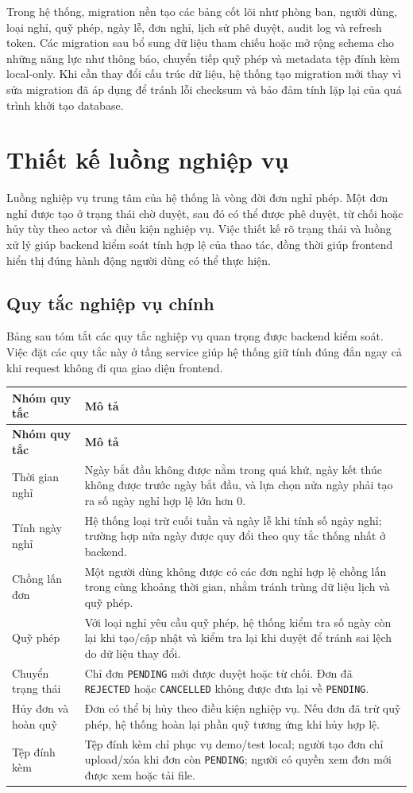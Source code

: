 Trong hệ thống, migration nền tạo các bảng cốt lõi như phòng ban, người dùng, loại nghỉ, quỹ phép, ngày lễ, đơn nghỉ, lịch sử phê duyệt, audit log và refresh token. Các migration sau bổ sung dữ liệu tham chiếu hoặc mở rộng schema cho những năng lực như thông báo, chuyển tiếp quỹ phép và metadata tệp đính kèm local-only. Khi cần thay đổi cấu trúc dữ liệu, hệ thống tạo migration mới thay vì sửa migration đã áp dụng để tránh lỗi checksum và bảo đảm tính lặp lại của quá trình khởi tạo database.

\section{Thiết kế luồng nghiệp vụ}
Luồng nghiệp vụ trung tâm của hệ thống là vòng đời đơn nghỉ phép. Một đơn nghỉ được tạo ở trạng thái chờ duyệt, sau đó có thể được phê duyệt, từ chối hoặc hủy tùy theo actor và điều kiện nghiệp vụ. Việc thiết kế rõ trạng thái và luồng xử lý giúp backend kiểm soát tính hợp lệ của thao tác, đồng thời giúp frontend hiển thị đúng hành động người dùng có thể thực hiện.

\subsection{Quy tắc nghiệp vụ chính}
Bảng sau tóm tắt các quy tắc nghiệp vụ quan trọng được backend kiểm soát. Việc đặt các quy tắc này ở tầng service giúp hệ thống giữ tính đúng đắn ngay cả khi request không đi qua giao diện frontend.

\begin{longtable}{p{}p{}}
\toprule
\textbf{Nhóm quy tắc} & \textbf{Mô tả} \\
\midrule
\endfirsthead
\toprule
\textbf{Nhóm quy tắc} & \textbf{Mô tả} \\
\midrule
\endhead
Thời gian nghỉ & Ngày bắt đầu không được nằm trong quá khứ, ngày kết thúc không được trước ngày bắt đầu, và lựa chọn nửa ngày phải tạo ra số ngày nghỉ hợp lệ lớn hơn 0. \\
Tính ngày nghỉ & Hệ thống loại trừ cuối tuần và ngày lễ khi tính số ngày nghỉ; trường hợp nửa ngày được quy đổi theo quy tắc thống nhất ở backend. \\
Chồng lấn đơn & Một người dùng không được có các đơn nghỉ hợp lệ chồng lấn trong cùng khoảng thời gian, nhằm tránh trùng dữ liệu lịch và quỹ phép. \\
Quỹ phép & Với loại nghỉ yêu cầu quỹ phép, hệ thống kiểm tra số ngày còn lại khi tạo/cập nhật và kiểm tra lại khi duyệt để tránh sai lệch do dữ liệu thay đổi. \\
Chuyển trạng thái & Chỉ đơn \texttt{PENDING} mới được duyệt hoặc từ chối. Đơn đã \texttt{REJECTED} hoặc \texttt{CANCELLED} không được đưa lại về \texttt{PENDING}. \\
Hủy đơn và hoàn quỹ & Đơn có thể bị hủy theo điều kiện nghiệp vụ. Nếu đơn đã trừ quỹ phép, hệ thống hoàn lại phần quỹ tương ứng khi hủy hợp lệ. \\
Tệp đính kèm & Tệp đính kèm chỉ phục vụ demo/test local; người tạo đơn chỉ upload/xóa khi đơn còn \texttt{PENDING}; người có quyền xem đơn mới được xem hoặc tải file. \\
\bottomrule
\end{longtable}


